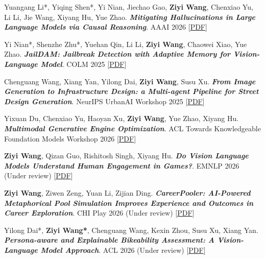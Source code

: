 \begin{enumerate}[leftmargin=0.35in, label={[\arabic*]}]
    \item \label{pub:hallucination} \small{Yuangang Li*, Yiqing Shen*, Yi Nian, Jiechao Gao, \textbf{Ziyi Wang}, Chenxiao Yu, Li Li, Jie Wang, Xiyang Hu, Yue Zhao. \textbf{\textit{Mitigating Hallucinations in Large Language Models via Causal Reasoning}}. AAAI 2026 [\href{https://arxiv.org/pdf/2508.12495}{PDF}]}
    
    \item \label{pub:jaildam} \small{Yi Nian*, Shenzhe Zhu*, Yuehan Qin, Li Li, \textbf{Ziyi Wang}, Chaowei Xiao, Yue Zhao. \textbf{\textit{JailDAM: Jailbreak Detection with Adaptive Memory for Vision-Language Model}}. COLM 2025 [\href{https://arxiv.org/pdf/2504.03770}{PDF}]}

    \item \label{pub:street} \small{Chenguang Wang, Xiang Yan, Yilong Dai, \textbf{Ziyi Wang}, Susu Xu. \textbf{\textit{From Image Generation to Infrastructure Design: a Multi-agent Pipeline for Street Design Generation}}. NeurIPS UrbanAI Workshop 2025
    [\href{https://arxiv.org/pdf/2509.05469}{PDF}]}   

    \item \label{pub:multimodal} \small{Yixuan Du, Chenxiao Yu, Haoyan Xu, \textbf{Ziyi Wang}, Yue Zhao, Xiyang Hu. \textbf{\textit{Multimodal Generative Engine Optimization}}. ACL Towards Knowledgeable Foundation Models Workshop 2026 [\href{https://papers.ssrn.com/sol3/papers.cfm?abstract_id=5917963}{PDF}]}   
    
    \item \label{pub:vlm-engagement} \small{\textbf{Ziyi Wang}, Qizan Guo, Rishitosh Singh, Xiyang Hu. \textbf{\textit{Do Vision Language Models Understand Human Engagement in Games?}}. EMNLP 2026 (Under review) [\href{https://arxiv.org/abs/2603.18480} {PDF}]}    
    
    \item \label{pub:careerpooler} \small{\textbf{Ziyi Wang}, Ziwen Zeng, Yuan Li, Zijian Ding. \textbf{\textit{CareerPooler: AI-Powered Metaphorical Pool Simulation Improves Experience and Outcomes in Career Exploration}}. CHI Play 2026 (Under review) [\href{https://arxiv.org/pdf/2509.11461}{PDF}]}

    
    \item \label{pub:bikeability} \small{Yilong Dai*, \textbf{Ziyi Wang*}, Chenguang Wang, Kexin Zhou, Susu Xu, Xiang Yan. \textbf{\textit{Persona-aware and Explainable Bikeability Assessment: A Vision-Language Model Approach}}. ACL 2026 (Under review) [\href{https://arxiv.org/pdf/2601.03534}{PDF}]}


\end{enumerate}
